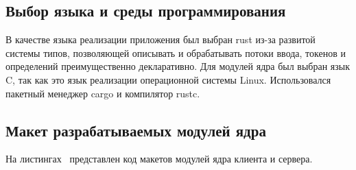 
\vspace{-1\baselineskip}

\subsection{Выбор языка и среды программирования}

В качестве языка реализации приложения был выбран rust из-за развитой системы
типов, позволяющей описывать и обрабатывать потоки ввода, токенов и определений
преимущественно декларативно. Для модулей ядра был выбран язык C, так как это
язык реализации операционной системы Linux. Использовался пакетный менеджер
cargo и компилятор rustc.

\subsection{Макет разрабатываемых модулей ядра} \label{sec:prototype}

На листингах~
представлен код макетов модулей ядра клиента и сервера.

